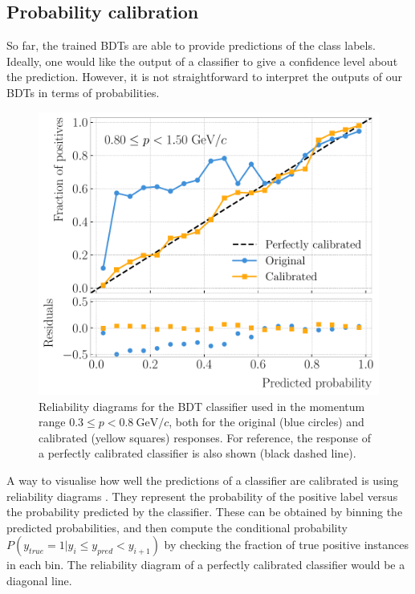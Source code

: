 \subsection{Probability calibration}

So far, the trained BDTs are able to provide predictions of the class labels. Ideally, one would like the output of a classifier to give a confidence level about the prediction. However, it is not straightforward to interpret the outputs of our BDTs in terms of probabilities.

\begin{figure}[t]
	\centering
	\includegraphics[width=.75\linewidth]{Images/GArSoft_PID/BDT/ecal_bdt_output_example_calibration_curves.pdf}
	\caption[Reliability diagrams for the BDT classifier used in the momentum range $0.3 \leq p < 0.8 ~ \mathrm{GeV}/c$.]{Reliability diagrams for the BDT classifier used in the momentum range $0.3 \leq p < 0.8 ~ \mathrm{GeV}/c$, both for the original (blue circles) and calibrated (yellow squares) responses. For reference, the response of a perfectly calibrated classifier is also shown (black dashed line).}
	\label{fig:bdt_calibration_curves}
\end{figure}

A way to visualise how well the predictions of a classifier are calibrated is using reliability diagrams \cite{Wilks1995}. They represent the probability of the positive label versus the probability predicted by the classifier. These can be obtained by binning the predicted probabilities, and then compute the conditional probability $P(y_{true}=1|y_{i} \leq y_{pred} < y_{i+1})$ by checking the fraction of true positive instances in each bin. The reliability diagram of a perfectly calibrated classifier would be a diagonal line.


